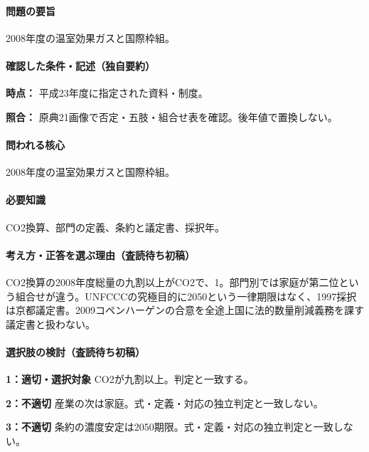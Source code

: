 \paragraph{問題の要旨} 2008年度の温室効果ガスと国際枠組。

\paragraph{確認した条件・記述（独自要約）}\mbox{}\par

\noindent\textbf{時点：} 平成23年度に指定された資料・制度。\par

\noindent\textbf{照合：} 原典21画像で否定・五肢・組合せ表を確認。後年値で置換しない。\par

\paragraph{問われる核心} 2008年度の温室効果ガスと国際枠組。

\paragraph{必要知識} CO2換算、部門の定義、条約と議定書、採択年。

\paragraph{考え方・正答を選ぶ理由（査読待ち初稿）} CO2換算の2008年度総量の九割以上がCO2で、1。部門別では家庭が第二位という組合せが違う。UNFCCCの究極目的に2050という一律期限はなく、1997採択は京都議定書。2009コペンハーゲンの合意を全途上国に法的数量削減義務を課す議定書と扱わない。

\paragraph{選択肢の検討（査読待ち初稿）}\mbox{}\par

\noindent\textbf{1：適切・選択対象} CO2が九割以上。判定と一致する。\par

\noindent\textbf{2：不適切} 産業の次は家庭。式・定義・対応の独立判定と一致しない。\par

\noindent\textbf{3：不適切} 条約の濃度安定は2050期限。式・定義・対応の独立判定と一致しない。\par

